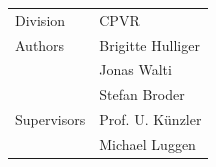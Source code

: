 \begin{titlepage}
\begin{flushleft}
\begin{tabular}{p{5cm}p{8cm}}
\Large{Division} & \Large{CPVR}\\[0.2cm]
\Large{Authors} & \Large{Brigitte Hulliger}\\[0.2cm]
& \Large{Jonas Walti}\\[0.2cm]
& \Large{Stefan Broder}\\[0.2cm]
\Large{Supervisors} & \Large{Prof. U. K\"unzler} \\[0.2cm]
& \Large{Michael Luggen }\\[0.2cm]
\end{tabular} 

 \end{flushleft}
\end{titlepage}
